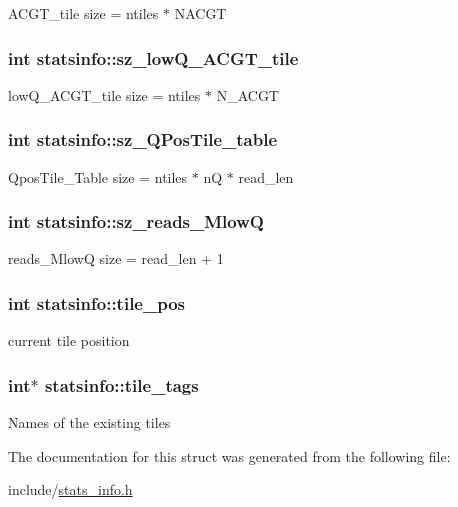 A\+C\+G\+T\+\_\+tile size = ntiles $\ast$ N\+A\+C\+G\+T \hypertarget{structstatsinfo_ae3c83d12e46748f3a0de4628b5e48068}{
\subsubsection[{sz\+\_\+low\+Q\+\_\+\+A\+C\+G\+T\+\_\+tile}]{\setlength{\rightskip}{0pt plus 5cm}int statsinfo\+::sz\+\_\+low\+Q\+\_\+\+A\+C\+G\+T\+\_\+tile}}\label{structstatsinfo_ae3c83d12e46748f3a0de4628b5e48068}
low\+Q\+\_\+\+A\+C\+G\+T\+\_\+tile size = ntiles $\ast$ N\+\_\+\+A\+C\+G\+T \hypertarget{structstatsinfo_aceed3737e42259fa6e7438dc185e587f}{
\subsubsection[{sz\+\_\+\+Q\+Pos\+Tile\+\_\+table}]{\setlength{\rightskip}{0pt plus 5cm}int statsinfo\+::sz\+\_\+\+Q\+Pos\+Tile\+\_\+table}}\label{structstatsinfo_aceed3737e42259fa6e7438dc185e587f}
Qpos\+Tile\+\_\+\+Table size = ntiles $\ast$ n\+Q $\ast$ read\+\_\+len \hypertarget{structstatsinfo_a5f0e812f7a2213cb57a79c8110b7a02e}{
\subsubsection[{sz\+\_\+reads\+\_\+\+Mlow\+Q}]{\setlength{\rightskip}{0pt plus 5cm}int statsinfo\+::sz\+\_\+reads\+\_\+\+Mlow\+Q}}\label{structstatsinfo_a5f0e812f7a2213cb57a79c8110b7a02e}
reads\+\_\+\+Mlow\+Q size = read\+\_\+len + 1 \hypertarget{structstatsinfo_a740378fa01d92f6e0b2c50a26889fefd}{
\subsubsection[{tile\+\_\+pos}]{\setlength{\rightskip}{0pt plus 5cm}int statsinfo\+::tile\+\_\+pos}}\label{structstatsinfo_a740378fa01d92f6e0b2c50a26889fefd}
current tile position \hypertarget{structstatsinfo_a25f475c79fa4d5aa1255b8c543d8a731}{
\subsubsection[{tile\+\_\+tags}]{\setlength{\rightskip}{0pt plus 5cm}int$\ast$ statsinfo\+::tile\+\_\+tags}}\label{structstatsinfo_a25f475c79fa4d5aa1255b8c543d8a731}
Names of the existing tiles 

The documentation for this struct was generated from the following file\+:\begin{DoxyCompactItemize}
\item 
include/\hyperlink{stats__info_8h}{stats\+\_\+info.\+h}\end{DoxyCompactItemize}

